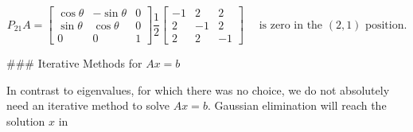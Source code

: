 \[P_{21}A=\begin{bmatrix}\cos\theta&-\sin\theta&0\\ \sin\theta&\cos\theta&0\\ 0&0&1\end{bmatrix}\frac{1}{2}\begin{bmatrix}-1&2&2\\ 2&-1&2\\ 2&2&-1\end{bmatrix}\quad\text{ is zero in the $(2,1)$ position}.\]

### Iterative Methods for \(Ax=b\)

In contrast to eigenvalues, for which there was no choice, we do not absolutely need an iterative method to solve \(Ax=b\). Gaussian elimination will reach the solution \(x\) in